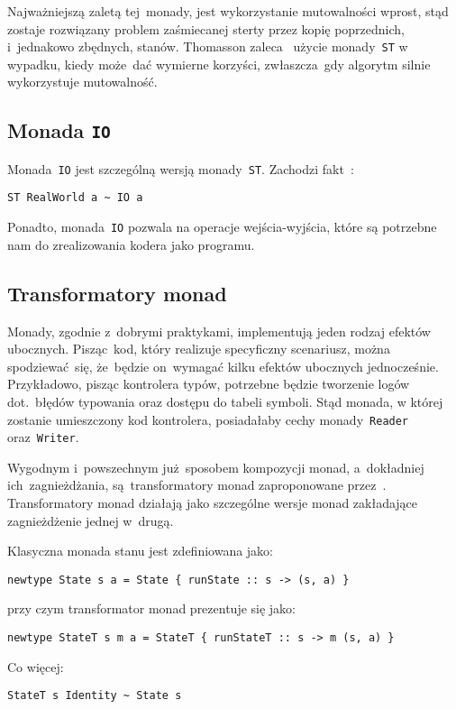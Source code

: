 \documentclass[../../praca.tex]{subfiles}
\begin{document}
Najważniejszą zaletą tej~monady, jest wykorzystanie mutowalności wprost, stąd zostaje rozwiązany
problem zaśmiecanej sterty przez kopię poprzednich, i~jednakowo zbędnych, stanów.
Thomasson zaleca~\cite{Thomasson:HHPP} użycie monady~\texttt{ST} w wypadku, kiedy
może~dać wymierne korzyści, zwłaszcza~gdy algorytm silnie wykorzystuje mutowalność.

\subsection{Monada \texttt{IO}}

Monada~\texttt{IO} jest szczególną wersją monady~\texttt{ST}. Zachodzi fakt~\cite{Snoyman:PH}:
\begin{verbatim}
ST RealWorld a ~ IO a
\end{verbatim}

Ponadto, monada~\texttt{IO} pozwala na operacje wejścia-wyjścia, które są potrzebne nam
do zrealizowania kodera jako programu. 

\subsection{Transformatory monad}

Monady, zgodnie z~dobrymi praktykami, implementują jeden rodzaj efektów ubocznych.
Pisząc~kod, który realizuje specyficzny scenariusz, można spodziewać~się, że~będzie
on~wymagać kilku efektów ubocznych jednocześnie. Przykładowo, pisząc kontrolera typów,
potrzebne będzie tworzenie logów dot.~błędów typowania oraz dostępu do tabeli symboli.
Stąd monada, w której zostanie umieszczony kod kontrolera, posiadałaby cechy monady~\texttt{Reader}
oraz~\texttt{Writer}.

Wygodnym i~powszechnym już~sposobem kompozycji monad, a~dokładniej ich~zagnieżdżania, 
są~transformatory monad 
zaproponowane przez~\cite{Jones:FPO}. Transformatory monad działają
jako szczególne wersje monad zakładające zagnieżdżenie jednej w~drugą.

Klasyczna monada stanu jest zdefiniowana jako:
\begin{verbatim}
newtype State s a = State { runState :: s -> (s, a) }
\end{verbatim}
przy czym transformator monad prezentuje się jako:
\begin{verbatim}
newtype StateT s m a = StateT { runStateT :: s -> m (s, a) }
\end{verbatim}
Co więcej:
\begin{verbatim}
StateT s Identity ~ State s
\end{verbatim}
\end{document}
